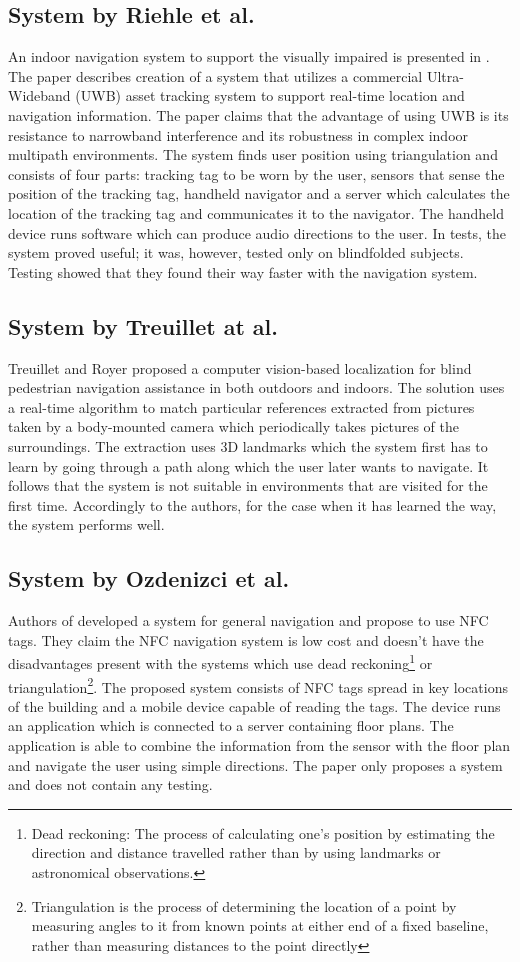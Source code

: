 \subsection{System by Riehle et al.}
An indoor navigation system to support the visually impaired is presented in \cite{riehle}. The paper describes creation of a system that utilizes a commercial Ultra-Wideband (UWB) asset tracking system to support real-time location and navigation information. The paper claims that the advantage of using UWB is its resistance to narrowband interference and its robustness in complex indoor multipath environments. The system finds user position using triangulation and consists of four parts: tracking tag to be worn by the user, sensors that sense the position of the tracking tag, handheld navigator and a server which calculates the location of the tracking tag and communicates it to the navigator. The handheld device runs software which can produce audio directions to the user. In tests, the system proved useful; it was, however, tested only on blindfolded subjects. Testing showed that they found their way faster with the navigation system. 

\subsection{System by Treuillet at al.}
Treuillet and Royer \cite{sylvie} proposed a computer vision-based localization for blind pedestrian navigation assistance in both outdoors and indoors. The solution uses a real-time algorithm to match particular references extracted from pictures taken by a body-mounted camera which periodically takes pictures of the surroundings. The extraction uses 3D landmarks which the system first has to learn by going through a path along which the user later wants to navigate. It follows that the system is not suitable in environments that are visited for the first time. Accordingly to the authors, for the case when it has learned the way, the system performs well.

\subsection{System by Ozdenizci et al.}
Authors of \cite{indoorNFC} developed a system for general navigation and propose to use NFC tags. They claim the NFC navigation system is low cost and doesn't have the disadvantages present with the systems which use dead reckoning\footnote{Dead reckoning: The process of calculating one’s position by estimating the direction and distance travelled rather than by using landmarks or astronomical observations.} or triangulation\footnote{Triangulation is the process of determining the location of a point by measuring angles to it from known points at either end of a fixed baseline, rather than measuring distances to the point directly}. The proposed system consists of NFC tags spread in key locations of the building and a mobile device capable of reading the tags. The device runs an application which is connected to a server containing floor plans. The application is able to combine the information from the sensor with the floor plan and navigate the user using simple directions. The paper only proposes a system and does not contain any testing.

